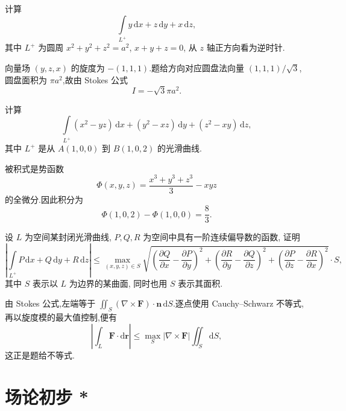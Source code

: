 \begin{example}
    计算
    \[
        \int\limits_{L^+}y\,\mathrm{d}x+z\,\mathrm{d}y+x\,\mathrm{d}z,
    \]
    其中 $L^+$ 为圆周 $x^2+y^2+z^2=a^2$, $x+y+z=0$, 从 $z$ 轴正方向看为逆时针.
\end{example}
\exampleblank

\begin{solution}
    向量场 $(y,z,x)$ 的旋度为 $-(1,1,1)$.题给方向对应圆盘法向量 $(1,1,1)/\sqrt{3}$,圆盘面积为 $\pi a^2$,故由 Stokes 公式
    \[
        I=-\sqrt{3}\pi a^2.
    \]
\end{solution}

\begin{example}
    计算
    \[
        \int\limits_{L^+}(x^2-yz)\,\mathrm{d}x+(y^2-xz)\,\mathrm{d}y+(z^2-xy)\,\mathrm{d}z,
    \]
    其中 $L^+$ 是从 $A(1,0,0)$ 到 $B(1,0,2)$ 的光滑曲线.
\end{example}
\exampleblank

\begin{solution}
    被积式是势函数
    \[
        \Phi(x,y,z)=\dfrac{x^3+y^3+z^3}{3}-xyz
    \]
    的全微分.因此积分为
    \[
        \Phi(1,0,2)-\Phi(1,0,0)=\dfrac{8}{3}.
    \]
\end{solution}

\begin{example}
    设 $L$ 为空间某封闭光滑曲线, $P,Q,R$ 为空间中具有一阶连续偏导数的函数, 证明
    \[
        \left|\int\limits_{L^+}P\,\mathrm{d}x+Q\,\mathrm{d}y+R\,\mathrm{d}z\right|
        \leq
        \max_{(x,y,z)\in S}
        \sqrt{
            \left(\dfrac{\partial Q}{\partial x}-\dfrac{\partial P}{\partial y}\right)^2+
            \left(\dfrac{\partial R}{\partial y}-\dfrac{\partial Q}{\partial z}\right)^2+
            \left(\dfrac{\partial P}{\partial z}-\dfrac{\partial R}{\partial x}\right)^2}
        \cdot S,
    \]
    其中 $S$ 表示以 $L$ 为边界的某曲面, 同时也用 $S$ 表示其面积.
\end{example}
\exampleblank

\begin{solution}
    由 Stokes 公式,左端等于 $\iint_S(\nabla\times\bm F)\cdot\bm n\,\mathrm{d}S$.逐点使用 Cauchy--Schwarz 不等式,再以旋度模的最大值控制,便有
    \[
        \left|\int_L\bm F\cdot\mathrm{d}\bm r\right|
        \leq\max_S|\nabla\times\bm F|\iint_S\mathrm{d}S,
    \]
    这正是题给不等式.
\end{solution}


\newpage

\section{场论初步 *}

